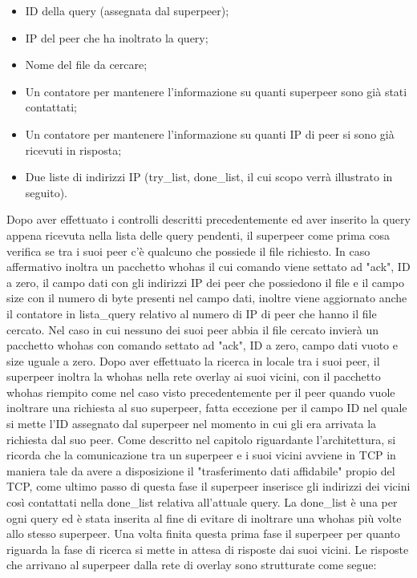 \begin{itemize}
\item ID della query (assegnata dal superpeer);
\item IP del peer che ha inoltrato la query;
\item Nome del file da cercare;
\item Un contatore per mantenere l'informazione su quanti superpeer sono già stati contattati;
\item Un contatore per mantenere l'informazione su quanti IP di peer si sono già ricevuti in risposta;
\item Due liste di indirizzi IP (try\_list, done\_list, il cui scopo verrà illustrato in seguito).
\end{itemize}
  
Dopo aver effettuato i controlli descritti precedentemente ed aver inserito la query appena ricevuta nella lista delle query pendenti, il superpeer come prima cosa verifica se tra i suoi peer c'è qualcuno che possiede il file richiesto. In caso affermativo inoltra un pacchetto whohas il cui comando viene settato ad "ack", ID a zero, il campo dati con gli indirizzi IP dei peer che possiedono il file e il campo size con il numero di byte presenti nel campo dati, inoltre viene aggiornato anche il contatore in lista\_query relativo al numero di IP di peer che hanno il file cercato. Nel caso in cui nessuno dei suoi peer abbia il file cercato invierà un pacchetto whohas con comando settato ad "ack", ID a zero, campo dati vuoto e size uguale a zero.\linebreak
Dopo aver effettuato la ricerca in locale tra i suoi peer, il superpeer inoltra la whohas nella rete overlay ai suoi vicini, con il pacchetto whohas riempito come nel caso visto precedentemente per il peer quando vuole inoltrare una richiesta al suo superpeer, fatta eccezione per il campo ID nel quale si mette l'ID assegnato dal superpeer nel momento in cui gli era arrivata la richiesta dal suo peer.\linebreak
Come descritto nel capitolo riguardante l'architettura, si ricorda che la comunicazione tra un superpeer e i suoi vicini avviene in TCP in maniera tale da avere a disposizione il "trasferimento dati affidabile" propio del TCP, come ultimo passo di questa fase il superpeer inserisce gli indirizzi dei vicini così contattati nella done\_list relativa all'attuale query.
La done\_list è una per ogni query ed è stata inserita al fine di evitare di inoltrare una whohas più volte allo stesso superpeer.\linebreak
Una volta finita questa prima fase il superpeer per quanto riguarda la fase di ricerca si mette in attesa di risposte dai suoi vicini.\linebreak
Le risposte che arrivano al superpeer dalla rete di overlay sono strutturate come segue:\linebreak

